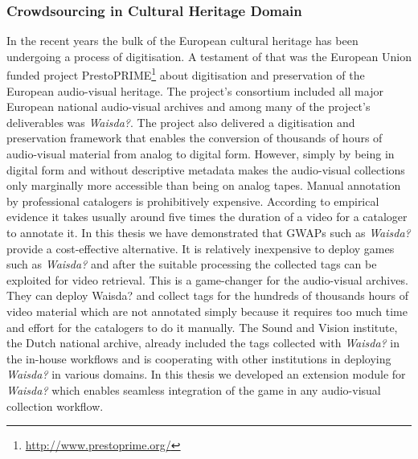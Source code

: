 \subsubsection{Crowdsourcing in Cultural Heritage Domain}
In the recent years the bulk of the European cultural heritage has been undergoing a process of digitisation. A testament of that was the European Union funded project PrestoPRIME\footnote{\url{http://www.prestoprime.org/}} about digitisation and preservation of the European audio-visual heritage. The project's consortium included all major European national audio-visual archives and among many of the project's deliverables was \textit{Waisda?}. The project also delivered a digitisation and preservation framework that enables the conversion of thousands of hours of audio-visual material from analog to digital form. However, simply by being in digital form and without descriptive metadata makes the audio-visual collections only marginally more accessible than being on analog tapes. Manual annotation by professional catalogers is prohibitively expensive. According to empirical evidence it takes usually around five times the duration of a video for a cataloger to annotate it. In this thesis we have demonstrated that GWAPs such as \textit{Waisda?} provide a cost-effective alternative. It is relatively inexpensive to deploy games such as \textit{Waisda?} and after the suitable processing the collected tags can be exploited for video retrieval. This is a game-changer for the audio-visual archives. They can deploy Waisda? and collect tags for the hundreds of thousands hours of video material which are not annotated simply because it requires too much time and effort for the catalogers to do it manually. The Sound and Vision institute, the Dutch national archive, already included the tags collected with \textit{Waisda?} in the in-house workflows and is cooperating with other institutions in deploying \textit{Waisda?} in various domains. In this thesis we developed an extension module for \textit{Waisda?} which enables seamless integration of the game in any audio-visual collection workflow.


